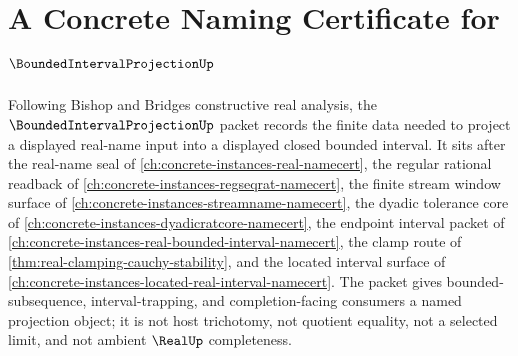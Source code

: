 \chapter{A Concrete Naming Certificate for $\BoundedIntervalProjectionUp$}
\label{ch:concrete-instances-bounded-interval-projection-namecert}

Following Bishop and Bridges constructive real analysis, the $\BoundedIntervalProjectionUp$ packet records the finite data needed to project a displayed real-name input into a displayed closed bounded interval. It sits after the real-name seal of \autoref{ch:concrete-instances-real-namecert}, the regular rational readback of \autoref{ch:concrete-instances-regseqrat-namecert}, the finite stream window surface of \autoref{ch:concrete-instances-streamname-namecert}, the dyadic tolerance core of \autoref{ch:concrete-instances-dyadicratcore-namecert}, the endpoint interval packet of \autoref{ch:concrete-instances-real-bounded-interval-namecert}, the clamp route of \autoref{thm:real-clamping-cauchy-stability}, and the located interval surface of \autoref{ch:concrete-instances-located-real-interval-namecert}. The packet gives bounded-subsequence, interval-trapping, and completion-facing consumers a named projection object; it is not host trichotomy, not quotient equality, not a selected limit, and not ambient $\RealUp$ completeness.

